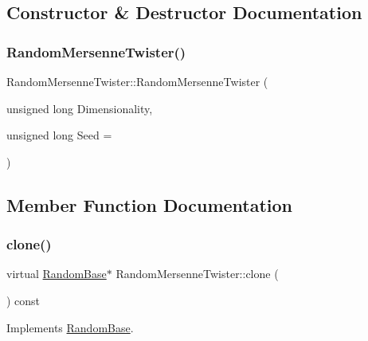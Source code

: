 \subsection{Constructor \& Destructor Documentation}
\hypertarget{classRandomMersenneTwister_ae9e37bfd7c85c150b68ab3fbe243bb7a}{}\label{classRandomMersenneTwister_ae9e37bfd7c85c150b68ab3fbe243bb7a} 
\subsubsection{\texorpdfstring{Random\+Mersenne\+Twister()}{RandomMersenneTwister()}}
{\footnotesize\ttfamily Random\+Mersenne\+Twister\+::\+Random\+Mersenne\+Twister (\begin{DoxyParamCaption}\item[{unsigned long}]{Dimensionality,  }\item[{unsigned long}]{Seed = {} }\end{DoxyParamCaption})}



\subsection{Member Function Documentation}
\hypertarget{classRandomMersenneTwister_a0faf486ea7b17d013b3165ac9fc8171d}{}\label{classRandomMersenneTwister_a0faf486ea7b17d013b3165ac9fc8171d} 
\subsubsection{\texorpdfstring{clone()}{clone()}}
{\footnotesize\ttfamily virtual \hyperlink{classRandomBase}{Random\+Base}$\ast$ Random\+Mersenne\+Twister\+::clone (\begin{DoxyParamCaption}{ }\end{DoxyParamCaption}) const\hspace{0.3cm}{\ttfamily [virtual]}}



Implements \hyperlink{classRandomBase_a0906f4590283535ec40427ad31ba7850}{Random\+Base}.

\hypertarget{classRandomMersenneTwister_aac61b45bc4e003cad863d39e8333a434}{}\label{classRandomMersenneTwister_aac61b45bc4e003cad863d39e8333a434} 
